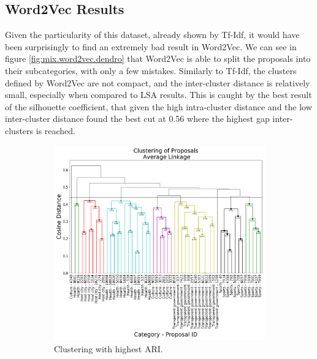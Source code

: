 \subsection{Word2Vec Results}
Given the particularity of this dataset, already shown by Tf-Idf, it would have been surprisingly to find an extremely bad result in Word2Vec. We can see in figure \ref{fig:mix.word2vec.dendro} that Word2Vec is able to split the proposals into their subcategories, with only a few mistakes. Similarly to Tf-Idf, the clusters defined by Word2Vec are not compact, and the inter-cluster distance is relatively small, especially when compared to LSA results. This is caught by the best result of the silhouette coefficient, that given the high intra-cluster distance and the low inter-cluster distance found the best cut at 0.56 where the highest gap inter-clusters is reached. 
\begin{figure}[!htpb]
  \centering 
  \begin{subfigure}[b]{0.59\textwidth}   
  \centering 
  \includegraphics[width=\textwidth]{word2vec/BEST_ARI_MIX.png}
  \caption[]%
  {{\small Clustering with highest ARI.}}    
  \label{fig:mix.word2vec.ari}
  \end{subfigure}
  \hfill
  \centering 
  \begin{subfigure}[b]{0.59\textwidth}   
  \centering 

\end{subfigure}
\end{figure}
